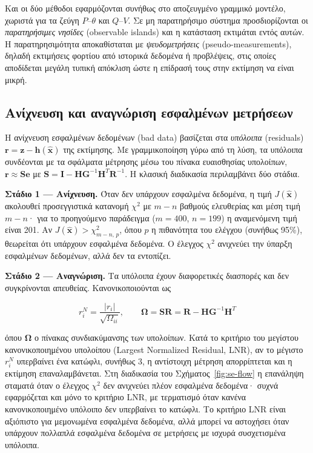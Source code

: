 Και οι δύο μέθοδοι εφαρμόζονται συνήθως στο αποζευγμένο γραμμικό μοντέλο, χωριστά για τα
ζεύγη $P$--$\theta$ και $Q$--$V$. Σε μη παρατηρήσιμο σύστημα προσδιορίζονται οι
\emph{παρατηρήσιμες νησίδες} (observable islands) και η κατάσταση εκτιμάται εντός αυτών. Η
παρατηρησιμότητα αποκαθίσταται με \emph{ψευδομετρήσεις} (pseudo-measurements), δηλαδή
εκτιμήσεις φορτίου από ιστορικά δεδομένα ή προβλέψεις, στις οποίες αποδίδεται μεγάλη τυπική
απόκλιση ώστε η επίδρασή τους στην εκτίμηση να είναι μικρή.

\subsection{Ανίχνευση και αναγνώριση εσφαλμένων μετρήσεων}
\label{sec:baddata}

Η ανίχνευση εσφαλμένων δεδομένων (bad data) βασίζεται στα \emph{υπόλοιπα} (residuals)
$\mathbf{r} = \mathbf{z}-\mathbf{h}(\hat{\mathbf{x}})$ της εκτίμησης. Με γραμμικοποίηση γύρω από
τη λύση, τα υπόλοιπα συνδέονται με τα σφάλματα μέτρησης μέσω του πίνακα ευαισθησίας
υπολοίπων, $\mathbf{r} \approx \mathbf{S}\mathbf{e}$ με
$\mathbf{S} = \mathbf{I} - \mathbf{H}\mathbf{G}^{-1}\mathbf{H}^{T}\mathbf{R}^{-1}$. Η κλασική
διαδικασία περιλαμβάνει δύο στάδια.

\textbf{Στάδιο 1 --- Ανίχνευση.} Όταν δεν υπάρχουν εσφαλμένα δεδομένα, η τιμή
$J(\hat{\mathbf{x}})$ ακολουθεί προσεγγιστικά κατανομή $\chi^2$ με $m-n$ βαθμούς ελευθερίας
και μέση τιμή $m-n$· για το προηγούμενο παράδειγμα ($m = 400$, $n = 199$) η αναμενόμενη τιμή
είναι 201. Αν $J(\hat{\mathbf{x}}) > \chi^2_{m-n,\,p}$, όπου $p$ η πιθανότητα του ελέγχου
(συνήθως 95\%), θεωρείται ότι υπάρχουν εσφαλμένα δεδομένα. Ο έλεγχος $\chi^2$ ανιχνεύει την
ύπαρξη εσφαλμένων δεδομένων, αλλά δεν τα εντοπίζει.

\textbf{Στάδιο 2 --- Αναγνώριση.} Τα υπόλοιπα έχουν διαφορετικές διασπορές και δεν
συγκρίνονται απευθείας. Κανονικοποιούνται ως

\begin{equation}
r_i^{N} = \frac{|r_i|}{\sqrt{\Omega_{ii}}}, \qquad
\boldsymbol{\Omega} = \mathbf{S}\mathbf{R} = \mathbf{R} - \mathbf{H}\mathbf{G}^{-1}\mathbf{H}^{T}
\label{eq:normres}
\end{equation}

όπου $\boldsymbol{\Omega}$ ο πίνακας συνδιακύμανσης των υπολοίπων. Κατά το κριτήριο του
μεγίστου κανονικοποιημένου υπολοίπου (Largest Normalized Residual, LNR), αν το μέγιστο
$r_i^{N}$ υπερβαίνει ένα κατώφλι, συνήθως 3, η αντίστοιχη μέτρηση απορρίπτεται και η
εκτίμηση επαναλαμβάνεται. Στη διαδικασία του Σχήματος~\ref{fig:se-flow}
η επανάληψη σταματά όταν ο έλεγχος $\chi^2$ δεν ανιχνεύει πλέον εσφαλμένα δεδομένα· συχνά
εφαρμόζεται και μόνο το κριτήριο LNR, με τερματισμό όταν κανένα κανονικοποιημένο υπόλοιπο δεν
υπερβαίνει το κατώφλι. Το κριτήριο LNR είναι αξιόπιστο για μεμονωμένα
εσφαλμένα δεδομένα, αλλά μπορεί να αστοχήσει όταν υπάρχουν πολλαπλά εσφαλμένα δεδομένα σε
μετρήσεις με ισχυρά συσχετισμένα υπόλοιπα.


